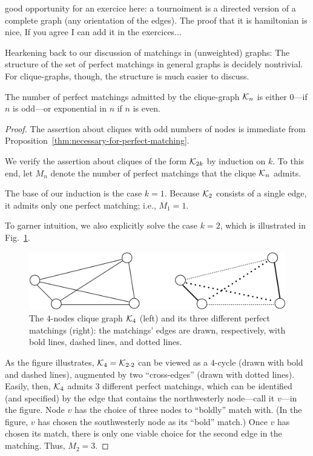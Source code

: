 {\Denis good opportunity for an exercice here: a tournoiment 
is a directed version of a complete graph (any orientation of the edges).
The proof that it is hamiltonian is nice, If you agree I can add it in the exercices...}

Hearkening back to our discussion of matchings in (unweighted) graphs:
The structure of the set of perfect matchings in general graphs is
decidely nontrivial.  For clique-graphs, though, the structure is much
easier to discuss.

\begin{prop}
\label{thm:perfect-matchings-clique}
The number of perfect matchings admitted by the clique-graph $\mbox{$\cal K$}_n$ is
either $0$---if $n$ is odd---or exponential in $n$ if $n$ is even.
\end{prop}

\begin{proof}
The assertion about cliques with odd numbers of nodes is immediate
from Proposition~\ref{thm:necessary-for-perfect-matching}.

We verify the assertion about cliques of the form $\mbox{$\cal K$}_{2k}$ by
induction on $k$.  To this end, let $M_n$ denote the number of perfect
matchings that the clique $\mbox{$\cal K$}_n$ admits.

The base of our induction is the case $k=1$.  Because $\mbox{$\cal K$}_{2}$
consists of a single edge, it admits only one perfect matching; i.e.,
$M_1 = 1$.

To garner intuition, we also explicitly solve the case $k=2$, which is
illustrated in Fig.~\ref{fig:AllPerfectMatchings}.
\begin{figure}[hbt]
\begin{center}
       \includegraphics[scale=0.55]{FiguresGraph/perfectmatchingAll}
       \caption{The $4$-nodes clique graph  $\mbox{$\cal K$}_4$ (left) and its three different perfect matchings (right): 
       the matchings' edges are drawn, respectively, with bold lines, dashed lines, and dotted lines.}
  \label{fig:AllPerfectMatchings}
\end{center}
\end{figure}
As the figure illustrates, $\mbox{$\cal K$}_4 = \mbox{$\cal K$}_{2 \cdot 2}$ can be viewed as a
$4$-cycle (drawn with bold and dashed lines), augmented by two
``cross-edges'' (drawn with dotted lines).  Easily, then, $\mbox{$\cal K$}_4$
admits $3$ different perfect matchings, which can be identified (and
specified) by the edge that contains the northwesterly node---call it
$v$---in the figure.  Node $v$ has the choice of three nodes to
``boldly'' match with. (In the figure, $v$ has chosen the
southwesterly node as its ``bold'' match.)  Once $v$ has chosen its
match, there is only one viable choice for the second edge in the
matching.  Thus, $M_2=3$.


\end{proof}
